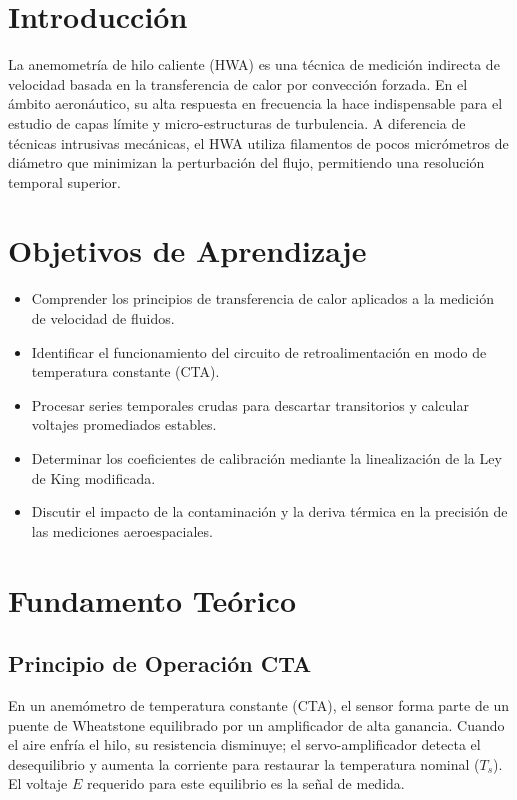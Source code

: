 \documentclass[11pt, a4paper]{article}
\begin{document}
\section{Introducción}
La anemometría de hilo caliente (HWA) es una técnica de medición indirecta de velocidad basada en la transferencia de calor por convección forzada. En el ámbito aeronáutico, su alta respuesta en frecuencia la hace indispensable para el estudio de capas límite y micro-estructuras de turbulencia. A diferencia de técnicas intrusivas mecánicas, el HWA utiliza filamentos de pocos micrómetros de diámetro que minimizan la perturbación del flujo, permitiendo una resolución temporal superior.

\section{Objetivos de Aprendizaje}
\begin{itemize}[label=-]
    \item Comprender los principios de transferencia de calor aplicados a la medición de velocidad de fluidos.
    \item Identificar el funcionamiento del circuito de retroalimentación en modo de temperatura constante (CTA).
    \item Procesar series temporales crudas para descartar transitorios y calcular voltajes promediados estables.
    \item Determinar los coeficientes de calibración mediante la linealización de la Ley de King modificada.
    \item Discutir el impacto de la contaminación y la deriva térmica en la precisión de las mediciones aeroespaciales.
\end{itemize}

\section{Fundamento Teórico}

\subsection{Principio de Operación CTA}
En un anemómetro de temperatura constante (CTA), el sensor forma parte de un puente de Wheatstone equilibrado por un amplificador de alta ganancia. Cuando el aire enfría el hilo, su resistencia disminuye; el servo-amplificador detecta el desequilibrio y aumenta la corriente para restaurar la temperatura nominal ($T_s$). El voltaje $E$ requerido para este equilibrio es la señal de medida.
\end{document}
